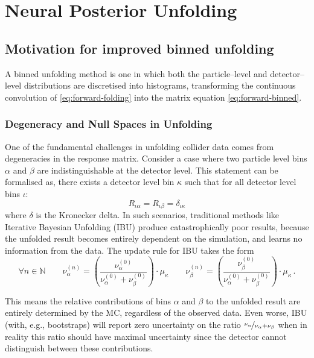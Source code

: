 \chapter{Neural Posterior Unfolding}
\label{chap:npu}
\section{Motivation for improved binned unfolding}
    A binned unfolding method is one in which both the particle--level and detector--level distributions are discretised into histograms, transforming the continuous convolution of \cref{eq:forward-folding} into the matrix equation \cref{eq:forward-binned}.

\subsection{Degeneracy and Null Spaces in Unfolding}
    One of the fundamental challenges in unfolding collider data comes from degeneracies in the response matrix.
    Consider a case where two particle level bins $\alpha$ and $\beta$ are indistinguishable at the detector level.
    This statement can be formalised as, there exists a detector level bin $\kappa$ such that for all detector level bins $\iota$:
    \begin{equation}
        R_{\iota\alpha} = R_{\iota\beta} = \delta_{\iota\kappa}
    \end{equation}
    where $\delta$ is the Kronecker delta.
    In such scenarios, traditional methods like Iterative Bayesian Unfolding (IBU) produce catastrophically poor results, because the unfolded result becomes entirely dependent on the simulation, and learns no information from the data.
    The update rule for IBU takes the form
    \begin{equation}
        \forall n \in \mathbb{N}
        \qquad
        \nu_{\alpha}^{(n)} = \left(\frac{\nu_\alpha^{(0)}}{\nu_\alpha^{(0)} + \nu_{\beta}^{(0)}}\right) \cdot \mu_\kappa
        \qquad
        \nu_{\beta}^{(n)} = \left(\frac{\nu_\beta^{(0)}}{\nu_\alpha^{(0)} + \nu_{\beta}^{(0)}}\right) \cdot \mu_\kappa\,.
    \end{equation}

    This means the relative contributions of bins $\alpha$ and $\beta$ to the unfolded result are entirely determined by the MC, regardless of the observed data.
    Even worse, IBU (with, e.g., bootstraps) will report zero uncertainty on the ratio \(\nicefrac{\nu_\alpha}{\nu_\alpha+\nu_\beta}\) when in reality this ratio should have maximal uncertainty since the detector cannot distinguish between these contributions.
